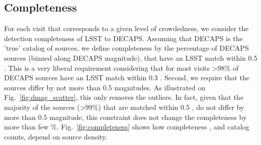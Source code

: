 \documentclass[DM,lsstdraft,toc,usenatbib]{lsstdoc}
\begin{document}
\subsection{Completeness}

For each visit that corresponds to a given level of crowdedness, we consider the detection completeness of LSST to DECAPS. Assuming that DECAPS is the 'true' catalog of sources, we define completeness by the percentage of DECAPS sources (binned along DECAPS magnitude), that have an LSST match within 0.5 \arcsec. This is a very liberal requirement considering that for most visits >98\% of DECAPS sources have an LSST match within 0.3 \arcsec.  Second,  we require that the sources differ by not more than 0.5 magnitudes. As illustrated on Fig.~\ref{fig:dmag_scatter}, this only removes the outliers.  In fact, given that the majority of the sources (>99\%) that are matched within 0.5 \arcsec, do not differ by more than 0.5 magnitude, this constraint does not change the completeness by more than few \%.   Fig.~\ref{fig:completeness} shows how completeness , and catalog counts, depend on source density.
\end{document}
